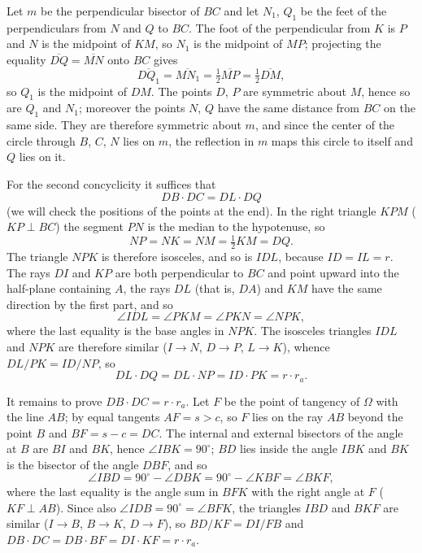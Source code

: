 {    Let $m$ be the perpendicular bisector of $BC$ and let $N_1$, $Q_1$ be the feet of the perpendiculars from $N$ and $Q$ to $BC$. The foot of the perpendicular from $K$ is $P$ and $N$ is the midpoint of $KM$, so $N_1$ is the midpoint of $MP$; projecting the equality $\overline{DQ} = \overline{MN}$ onto $BC$ gives
    $$
    \overline{DQ_1} = \overline{MN_1} = \tfrac12 \overline{MP} = \tfrac12 \overline{DM},
    $$
    so $Q_1$ is the midpoint of $DM$. The points $D$, $P$ are symmetric about $M$, hence so are $Q_1$ and $N_1$; moreover the points $N$, $Q$ have the same distance from $BC$ on the same side. They are therefore symmetric about $m$, and since the center of the circle through $B$, $C$, $N$ lies on $m$, the reflection in $m$ maps this circle to itself and $Q$ lies on it.

    For the second concyclicity it suffices that
    $$
    DB \cdot DC = DL \cdot DQ
    $$
    (we will check the positions of the points at the end). In the right triangle $KPM$ ($KP \perp BC$) the segment $PN$ is the median to the hypotenuse, so
    $$
    NP = NK = NM = \tfrac12 KM = DQ.
    $$
    The triangle $NPK$ is therefore isosceles, and so is $IDL$, because $ID = IL = r$. The rays $DI$ and $KP$ are both perpendicular to $BC$ and point upward into the half-plane containing $A$, the rays $DL$ (that is, $DA$) and $KM$ have the same direction by the first part, and so
    $$
    \angle IDL = \angle PKM = \angle PKN = \angle NPK,
    $$
    where the last equality is the base angles in $NPK$. The isosceles triangles $IDL$ and $NPK$ are therefore similar ($I \to N$, $D \to P$, $L \to K$), whence $DL/PK = ID/NP$, so
    $$
    DL \cdot DQ = DL \cdot NP = ID \cdot PK = r \cdot r_a.
    $$

    It remains to prove $DB \cdot DC = r \cdot r_a$. Let $F$ be the point of tangency of $\Omega$ with the line $AB$; by equal tangents $AF = s > c$, so $F$ lies on the ray $AB$ beyond the point $B$ and $BF = s-c = DC$. The internal and external bisectors of the angle at $B$ are $BI$ and $BK$, hence $\angle IBK = 90^\circ$; $BD$ lies inside the angle $IBK$ and $BK$ is the bisector of the angle $DBF$, and so
    $$
    \angle IBD = 90^\circ - \angle DBK = 90^\circ - \angle KBF = \angle BKF,
    $$
    where the last equality is the angle sum in $BFK$ with the right angle at $F$ ($KF \perp AB$). Since also $\angle IDB = 90^\circ = \angle BFK$, the triangles $IBD$ and $BKF$ are similar ($I \to B$, $B \to K$, $D \to F$), so $BD/KF = DI/FB$ and $DB \cdot DC = DB \cdot BF = DI \cdot KF = r \cdot r_a$.

}
